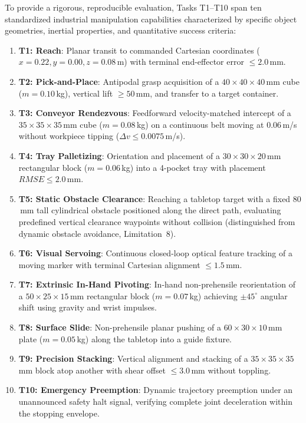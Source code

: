 \documentclass[journal]{IEEEtran}
\begin{document}
To provide a rigorous, reproducible evaluation, Tasks T1--T10 span ten standardized industrial manipulation capabilities characterized by specific object geometries, inertial properties, and quantitative success criteria:
\begin{enumerate}
    \item \textbf{T1: Reach}: Planar transit to commanded Cartesian coordinates ($x=0.22, y=0.00, z=0.08$\,m) with terminal end-effector error $\le 2.0$\,mm.
    \item \textbf{T2: Pick-and-Place}: Antipodal grasp acquisition of a $40\times 40\times 40$\,mm cube ($m=0.10$\,kg), vertical lift $\ge 50$\,mm, and transfer to a target container.
    \item \textbf{T3: Conveyor Rendezvous}: Feedforward velocity-matched intercept of a $35\times 35\times 35$\,mm cube ($m=0.08$\,kg) on a continuous belt moving at $0.06$\,m/s without workpiece tipping ($\Delta v \le 0.0075$\,m/s).
    \item \textbf{T4: Tray Palletizing}: Orientation and placement of a $30\times 30\times 20$\,mm rectangular block ($m=0.06$\,kg) into a 4-pocket tray with placement $RMSE \le 2.0$\,mm.
    \item \textbf{T5: Static Obstacle Clearance}: Reaching a tabletop target with a fixed $80$\,mm tall cylindrical obstacle positioned along the direct path, evaluating predefined vertical clearance waypoints without collision (distinguished from dynamic obstacle avoidance, Limitation~8).
    \item \textbf{T6: Visual Servoing}: Continuous closed-loop optical feature tracking of a moving marker with terminal Cartesian alignment $\le 1.5$\,mm.
    \item \textbf{T7: Extrinsic In-Hand Pivoting}: In-hand non-prehensile reorientation of a $50\times 25\times 15$\,mm rectangular block ($m=0.07$\,kg) achieving $\pm 45^\circ$ angular shift using gravity and wrist impulses.
    \item \textbf{T8: Surface Slide}: Non-prehensile planar pushing of a $60\times 30\times 10$\,mm plate ($m=0.05$\,kg) along the tabletop into a guide fixture.
    \item \textbf{T9: Precision Stacking}: Vertical alignment and stacking of a $35\times 35\times 35$\,mm block atop another with shear offset $\le 3.0$\,mm without toppling.
    \item \textbf{T10: Emergency Preemption}: Dynamic trajectory preemption under an unannounced safety halt signal, verifying complete joint deceleration within the stopping envelope.
\end{enumerate}
\end{document}
